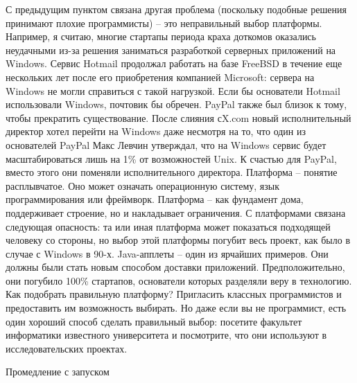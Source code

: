 \documentclass[ebook,12pt,oneside,openany]{memoir}
\begin{document}
С предыдущим пунктом связана другая проблема (поскольку подобные
решения принимают плохие программисты) – это неправильный выбор
платформы. Например, я считаю, многие стартапы периода краха доткомов
оказались неудачными из-за решения заниматься разработкой серверных
приложений на Windows. Сервис Hotmail продолжал работать на базе
FreeBSD в течение еще нескольких лет после его приобретения компанией
Microsoft: сервера на Windows не могли справиться с такой нагрузкой.
Если бы основатели Hotmail использовали Windows, почтовик бы обречен.
PayPal также был близок к тому, чтобы прекратить существование. После
слияния сX.com новый исполнительный директор хотел перейти на Windows
даже несмотря на то, что один из основателей PayPal Макс Левчин
утверждал, что на Windows сервис будет масштабироваться лишь на 1\% от
возможностей Unix. К счастью для PayPal, вместо этого они поменяли
исполнительного директора. Платформа – понятие расплывчатое. Оно может
означать операционную систему, язык программирования или фреймворк.
Платформа – как фундамент дома, поддерживает строение, но и
накладывает ограничения. С платформами связана следующая опасность: та
или иная платформа может показаться подходящей человеку со стороны, но
выбор этой платформы погубит весь проект, как было в случае с Windows
в 90-х. Java-апплеты – один из ярчайших примеров. Они должны были
стать новым способом доставки приложений. Предположительно, они
погубило 100\% стартапов, основатели которых разделяли веру в
технологию. Как подобрать правильную платформу? Пригласить классных
программистов и предоставить им возможность выбирать. Но даже если вы
не программист, есть один хороший способ сделать правильный выбор:
посетите факультет информатики известного университета и посмотрите,
что они используют в исследовательских проектах.

Промедление с запуском
\end{document}
